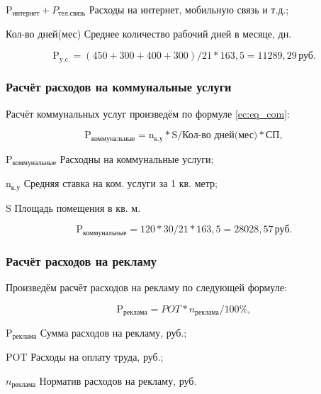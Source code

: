 \begin{eqexpl}[18ex]
    \item{$\text{P}_\text{интернет} + P_\text{тел.связь}$} Расходы на интернет, мобильную связь и т.д.;
    \item{Кол-во дней(мес)} Среднее количество рабочий дней в месяце, дн.
\end{eqexpl}

\begin{equation*}
    \text{P}_\text{y.c.} = (450 + 300 + 400 + 300) / 21 * 163,5 = 11289,29 \, \text{руб}.
\end{equation*}

\subsubsection{Расчёт расходов на коммунальные услуги}

Расчёт коммунальных услуг произведём по формуле \ref{ec:eq_com}:

\begin{equation}
    \label{ec:eq_com}
    \text{P}_\text{коммунальные} = \text{n}_\text{к.у} * \text{S} / \text{Кол-во дней(мес)} * \text{СП},
\end{equation}

\begin{eqexpl}[12ex]
    \item{$\text{P}_\text{коммунальные}$} Расходны на коммунальные услуги;
    \item{$\text{n}_\text{к.у}$} Средняя ставка на ком. услуги за 1 кв. метр;
    \item{$\text{S}$} Площадь помещения в кв. м.
\end{eqexpl}

\begin{equation*}
    \text{P}_\text{коммунальные} = 120 * 30 / 21 * 163,5 = 28028,57 \, \text{руб}.
\end{equation*}

\subsubsection{Расчёт расходов на рекламу}

Произведём расчёт расходов на рекламу по следующей формуле:

\begin{equation}
    \text{P}_\text{реклама} = POT * n_\text{реклама} / 100\%,
\end{equation}

\begin{eqexpl}[7ex]
    \item{$\text{P}_\text{реклама}$} Сумма расходов на рекламу, руб.;
    \item{$\text{POT}$} Расходы на оплату труда, руб.;
    \item{$n_\text{реклама}$} Норматив расходов на рекламу, руб.
\end{eqexpl}

